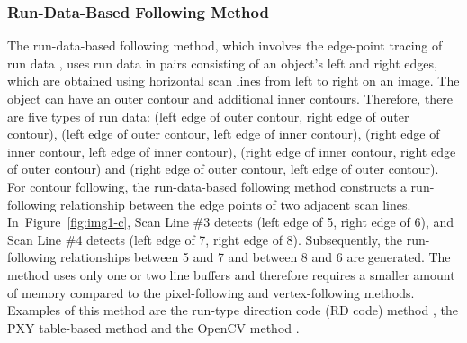 \documentclass[sensors,article,accept,moreauthors,pdftex,10pt,a4paper]{mdpi}
\begin{document}
\subsubsection{Run-Data-Based Following Method}

The run-data-based following method, which involves the edge-point tracing of run data \cite{Miyatake1997Contour,Shoji1999Contour}, uses run data in pairs consisting of an object's left and right edges, which are obtained using horizontal scan lines from left to right on an image. The object can have an outer contour and additional inner contours. Therefore, there are five types of run data: (left edge of outer contour, right edge of outer contour), (left edge of outer contour, left edge of inner contour), (right edge of inner contour, left edge of inner contour), (right edge of inner contour, right edge of outer contour) and (right edge of outer contour, left edge of outer contour). For contour following, the run-data-based following method constructs a run-following relationship between the edge points of two adjacent scan lines. In~\mbox{Figure \ref{fig:img1-c}}, Scan Line \#3 detects (left edge of 5, right edge of 6), and Scan Line \#4 detects (left edge of 7, right edge of 8). Subsequently, the run-following relationships between 5 and 7 and between 8 and 6 are generated. The method uses only one or two line buffers and therefore requires a smaller amount of memory compared to the pixel-following and vertex-following methods. Examples of this method are the run-type direction code (RD code) method \cite{Miyatake1997Contour}, the PXY table-based method \cite{Shoji1999Contour} and the OpenCV method \cite{Suzuki1985Topological}. 
\end{document}
